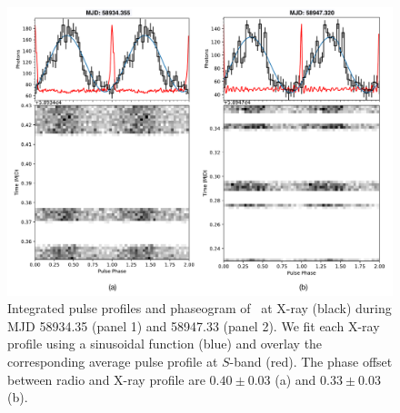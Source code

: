 \documentclass[twocolumn]{emulateapj}
\begin{document}
\begin{figure}[b]
	\centering
	\includegraphics[trim=0cm 0cm 0cm 0cm, clip=false, scale=0.4, angle=0]{plots/average_phaseogram.pdf}
	\caption{ Integrated pulse profiles and phaseogram of \jmag\ at X-ray (black) 
              during MJD 58934.35 (panel 1) and 58947.33 (panel 2). We fit each X-ray 
              profile using a sinusoidal function (blue) and overlay the corresponding 
              average pulse profile at $S$-band (red). The phase offset between radio 
              and X-ray profile are $0.40 \pm 0.03 $ (a) and $0.33 \pm 0.03$ (b).}
    \label{fig:xray_radio}
\end{figure}
\end{document}
